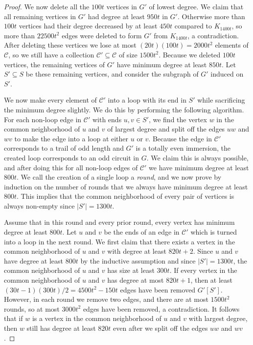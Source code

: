 \documentclass{article}
\theoremstyle{definition}
\begin{document}
\begin{proof}
    We now delete all the $100t$ vertices in $G'$ of lowest degree. We claim that all remaining vertices in $G'$ had degree at least $950t$ in $G'$. Otherwise more than $100t$ vertices had their degree decreased by at least $450t$ compared to $K_{1400t}$, so more than $22500t^2$ edges were deleted to form $G'$ from $K_{1400t}$, a contradiction. After deleting these vertices we lose at most $(20t)(100t) = 2000t^2$ elements of $\mathcal{C}$, so we still have a collection $\mathcal{C}' \subseteq \mathcal{C}$ of size $1500t^2$. Because we deleted $100t$ vertices, the remaining vertices of $G'$ have minimum degree at least $850t$. Let $S' \subseteq S$ be these remaining vertices, and consider the subgraph of $G'$ induced on $S'$.

    We now make every element of $\mathcal{C}'$ into a loop with its end in $S'$ while sacrificing the minimum degree slightly. We do this by performing the following algorithm. For each non-loop edge in $\mathcal{C}'$ with ends $u,v \in S'$, we find the vertex $w$ in the common neighborhood of $u$ and $v$ of largest degree and split off the edges $uw$ and $wv$ to make the edge into a loop at either $u$ or $v$. Because the edge in $\mathcal{C}'$ corresponds to a trail of odd length and $G'$ is a totally even immersion, the created loop corresponds to an odd circuit in $G$. We claim this is always possible, and after doing this for all non-loop edges of $\mathcal{C}'$ we have minimum degree at least $800t$. We call the creation of a single loop a \emph{round}, and we now prove by induction on the number of rounds that we always have minimum degree at least $800t$. This implies that the common neighborhood of every pair of vertices is always non-empty since $|S'|=1300t$.
    
    Assume that in this round and every prior round, every vertex has minimum degree at least $800t$. Let $u$ and $v$ be the ends of an edge in $\mathcal{C}'$ which is turned into a loop in the next round. We first claim that there exists a vertex in the common neighborhood of $u$ and $v$ with degree at least $820t+2$. Since $u$ and $v$ have degree at least $800t$ by the inductive assumption and since $|S'| = 1300t$, the common neighborhood of $u$ and $v$ has size at least $300t$. If every vertex in the common neighborhood of $u$ and $v$ has degree at most $820t+1$, then at least $(30t-1)(300t)/2=4500t^2-150t$ edges have been removed $G'[S']$. However, in each round we remove two edges, and there are at most $1500t^2$ rounds, so at most $3000t^2$ edges have been removed, a contradiction. It follows that if $w$ is a vertex in the common neighborhood of $u$ and $v$ with largest degree, then $w$ still has degree at least $820t$ even after we split off the edges $uw$ and $wv$.


\end{proof}
\end{document}
